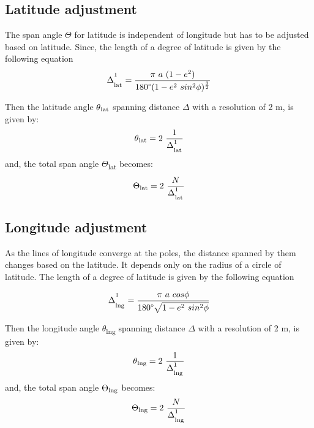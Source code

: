 \documentclass[conference]{IEEEtran}
\begin{document}
\subsection{Latitude adjustment}
The span angle $\Theta$ for latitude is independent of longitude but has to be adjusted based on latitude.
Since, the length of a degree of latitude is given by the following equation\cite{b2}
\begin{equation}\Delta^\textsuperscript{1}_\textsubscript{lat}=\frac{\pi \ a \ (1 - e^2)} {180\degree (1 - e\textsuperscript{2} \ sin\textsuperscript{2}\phi)^\frac{3}{2}}\end{equation}

Then the latitude angle $\theta\textsubscript{lat}$ spanning distance $\Delta$ with a resolution of 2 m, is given by:
\begin{equation}\theta\textsubscript{lat} = 2 \ \frac{1}{\Delta^\textsuperscript{1}_\textsubscript{lat}}\end{equation}
and, the total span angle $\Theta$\textsubscript{lat} becomes:
\begin{equation}\Theta\textsubscript{lat} = 2 \ \frac{N}{\Delta^\textsuperscript{1}_\textsubscript{lat}}\end{equation}

\subsection{Longitude adjustment}
As the lines of longitude converge at the poles, the distance spanned by them changes based on the latitude. It depends only on the radius of a circle of latitude. The length of a degree of latitude is given by the following equation\cite{b3}

\begin{equation}\Delta^\textsuperscript{1}_\textsubscript{lng}=\frac{\pi \ a \ cos\phi} {180\degree \sqrt{1-e\textsuperscript{2} \ sin\textsuperscript{2}\phi}}\end{equation}

Then the longitude angle $\theta$\textsubscript{lng} spanning distance $\Delta$ with a resolution of 2 m, is given by:
\begin{equation}\theta\textsubscript{lng} = 2 \ \frac{1}{\Delta^\textsuperscript{1}_\textsubscript{lng}}\end{equation}
and, the total span angle $\Theta\textsubscript{lng}$ becomes:
\begin{equation}\Theta\textsubscript{lng} = 2 \ \frac{N}{\Delta^\textsuperscript{1}_\textsubscript{lng}}\end{equation}\\
\end{document}
